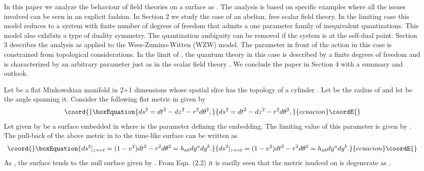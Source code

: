 \documentclass[a4paper,12pt]{article}
\let\oldtheequation=\theequation
\def\doteqs#1{\setcounter{equation}{0}
            \def\theequation{{#1}.\oldtheequation}}
\newcounter{sxn}
\def\sx#1{\addtocounter{sxn}{1} \bigskip\medskip \goodbreak
\noindent{\large\bf
\centerline{\thesxn.~~#1}} \nobreak \medskip}
\def\sxn#1{\sx{#1} \doteqs{\thesxn}}
\begin{document}
In this paper we analyze the behaviour of field theories on a 
surface \coordHE{} as \coordHE{}.
The analysis  is based on specific examples where 
all the issues involved can be seen in an explicit
fashion. In Section 2 we study the case of an 
abelian, free scalar field theory.
In the limiting case this model reduces to a system with finite number of
degrees of freedom that admits a one parameter family of inequivalent
quantizations. This model also exhibits a type of duality symmetry. 
The quantization ambiguity can be removed if the system is at the self-dual
point.
Section 3 describes the analysis as applied to the  \coordHE{}  
Wess-Zumino-Witten (WZW) model. The parameter in front of the action in this
case is constrained from topological considerations. 
In the limit of \coordHE{}, 
the  quantum theory in this case is  described by a finite
 degrees of freedom and is characterized by an arbitrary
 parameter just as in the scalar field theory . We
 conclude the paper in Section 4 with a summary and outlook.

\sxn{Scalar Field}

Let \coordHE{} be a flat Minkowskian manifold in 2+1 dimensions 
whose spatial slice has the topology of a cylinder \coordHE{} . 
Let \coordHE{} be the radius of \coordHE{} and let \myHighlight{$\theta$}\coordHE{} be the angle spanning it.
Consider the following flat metric in \coordHE{} given by
\begin{equation}\coord{}\boxEquation{
ds^{2}=dt^{2}-dz^{2}-r^2d{\theta}^{2},
}{
ds^{2}=dt^{2}-dz^{2}-r^2d{\theta}^{2},
}{ecuacion}\coordE{}\end{equation}
Let \coordHE{} given by \coordHE{} be a surface embedded in \coordHE{} where \coordHE{} is the
parameter defining the embedding. The limiting value of this parameter is
given by \coordHE{}.
The pull-back of the 
 above metric in \coordHE{} 
to the time-like surface \coordHE{} can be written as 
\begin{equation}\coord{}\boxEquation{
ds^2|_{z=vt}=(1-v^2)dt^2-r^2d{\theta}^2 = h_{ab}dy^{a}dy^{b}.
}{
ds^2|_{z=vt}=(1-v^2)dt^2-r^2d{\theta}^2 = h_{ab}dy^{a}dy^{b}.
}{ecuacion}\coordE{}\end{equation}
As \coordHE{}, the surface \coordHE{} tends to 
 the null surface \coordHE{} given by \coordHE{} .
From Eqn. (2.2) it is easilly seen that
 the  metric \coordHE{} inudced on \coordHE{} is degenerate as 
\coordHE{}.
\end{document}
